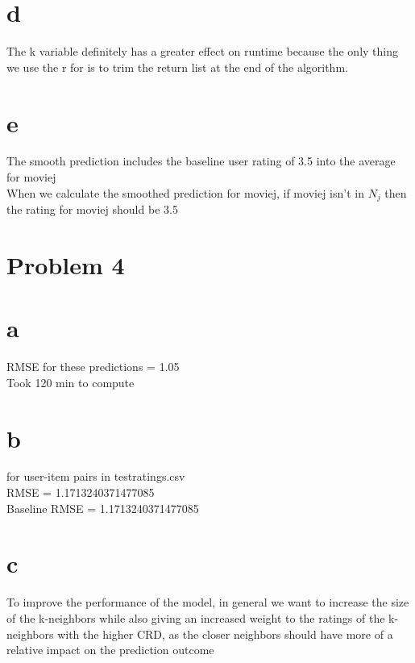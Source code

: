 \documentclass[12pt]{article}
\begin{document}
 \section*{d} 
 The k variable definitely has a greater effect on runtime because the only thing we use the r for is to trim the return list at the end of the algorithm. \\
  \section*{e}
The smooth prediction includes the baseline user rating of 3.5 into the average for moviej \\
When we calculate the smoothed prediction for moviej, if moviej isn't in $N_{j}$ then the rating for moviej should be 3.5 \\

\section*{Problem 4} 
\section*{a} RMSE for these predictions = 1.05 \\
Took 120 min to compute \\

\section*{b}
for user-item pairs in testratings.csv \\
RMSE = 1.1713240371477085 \\
Baseline RMSE = 1.1713240371477085 \\
\section*{c}

To improve the performance of the model, in general we want to increase the size of the k-neighbors while also giving an increased weight to the ratings of the k-neighbors with the higher CRD, as the closer neighbors should have more of a relative impact on the prediction outcome \\
\end{document}
